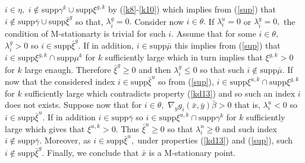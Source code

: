 	$i\in\eta,$ $i\notin\mathrm{supp}\gamma^{k}\cup\mathrm{supp}\xi^{g,k}$ by
	(\ref{k8}-\ref{k10}) which implies from (\ref{sup}) that $i\notin
	\mathrm{supp}\bar{\gamma}\cup\mathrm{supp}\bar{\xi}^{g}$ so that, $\lambda
	_{i}^{g}=0.$ Consider now $i\in\theta.$ If $\lambda_{i}^{u}=0$ or $\lambda
	_{i}^{g}=0,$ the condition of M-stationarty is trivial for such $i$. Assume
	that for some $i\in\theta,$ $\lambda_{i}^{g}>0$ so $i\in\mathrm{supp}\bar{\xi
	}^{g}.$ If in addition, $i\in\mathrm{supp}\bar{\mu}$ this implies from
	(\ref{sup}) that $i\in\mathrm{supp}\xi^{g,k}\cap\mathrm{supp}\mu^{k}$ for $k$
	sufficiently large which in turn implies that $\xi^{g,k}>0 $ for $k$ large
	enaugh$.$ Therefore $\bar{\xi}^{g}\geq0$ and then $\lambda_{i}^{g}\leq0$ so
	that such $i\notin\mathrm{supp}\bar{\mu}.$ If now that the considered index
	$i\in\mathrm{supp}\bar{\xi}^{u}$ so from (\ref{sup}), $i\in\mathrm{supp}%
	\xi^{u,k}\cap\mathrm{supp}\xi^{g,k}$ for $k$ sufficiently large which
	contradicts property (\ref{kd13}) and so such an index $i$ does not exists.
	Suppose now that for $i\in\theta,$ $\nabla_{y}g_{i}(\bar{x},\bar{y})\bar
	{\beta}>0$ that is, $\lambda_{i}^{u}<0$ so $i\in\mathrm{supp}\bar{\xi}^{u}.$
	If in addition $i\in\mathrm{supp}\bar{\gamma}$ so $i\in\mathrm{supp}\xi
	^{u,k}\cap\mathrm{supp}\gamma^{k}$ for $k$ sufficiently large which gives that
	$\xi^{u,k}>0.$ Thus $\bar{\xi}^{u}\geq0$ so that $\lambda_{i}^{u}\geq0$ and
	such index $i\notin\mathrm{supp}\bar{\gamma}$. Moreover, as $i\in
	\mathrm{supp}\bar{\xi}^{u},$ under properties (\ref{kd13}) and (\ref{sup}),
	such $i\notin\mathrm{supp}\bar{\xi}^{g}.$ Finally, we conclude that $\bar{x}$
	is a M-stationary point. 

